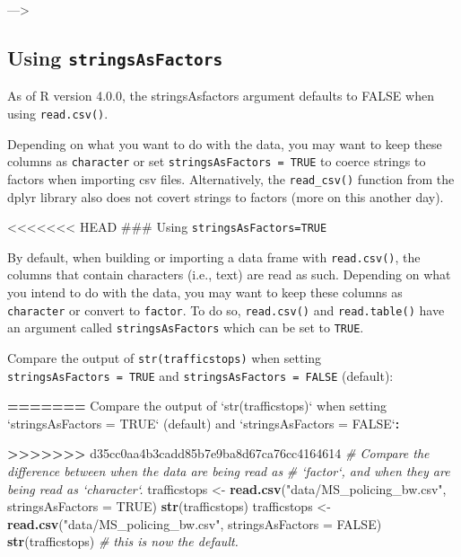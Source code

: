\documentclass[
]{book}
\newenvironment{Shaded}{\begin{snugshade}}{\end{snugshade}}
\newcommand{\CommentTok}[1]{\textcolor[rgb]{0.56,0.35,0.01}{\textit{#1}}}
\newcommand{\DataTypeTok}[1]{\textcolor[rgb]{0.13,0.29,0.53}{#1}}
\newcommand{\ErrorTok}[1]{\textcolor[rgb]{0.64,0.00,0.00}{\textbf{#1}}}
\newcommand{\KeywordTok}[1]{\textcolor[rgb]{0.13,0.29,0.53}{\textbf{#1}}}
\newcommand{\NormalTok}[1]{#1}
\newcommand{\OperatorTok}[1]{\textcolor[rgb]{0.81,0.36,0.00}{\textbf{#1}}}
\newcommand{\OtherTok}[1]{\textcolor[rgb]{0.56,0.35,0.01}{#1}}
\newcommand{\StringTok}[1]{\textcolor[rgb]{0.31,0.60,0.02}{#1}}
\begin{document}
---\textgreater{}

\hypertarget{using-stringsasfactors}{%
\subsection{\texorpdfstring{Using \texttt{stringsAsFactors}}{Using stringsAsFactors}}\label{using-stringsasfactors}}

As of R version 4.0.0, the stringsAsfactors argument defaults to FALSE when using \texttt{read.csv()}.

Depending on what you want to do with the data, you may want to keep these columns as \texttt{character} or set \texttt{stringsAsFactors\ =\ TRUE} to coerce strings to factors when importing csv files. Alternatively, the \texttt{read\_csv()} function from the dplyr library also does not covert strings to factors (more on this another day).

\textless\textless\textless\textless\textless\textless\textless{} HEAD
\#\#\# Using \texttt{stringsAsFactors=TRUE}

By default, when building or importing a data frame with \texttt{read.csv()}, the columns that contain characters (i.e., text) are read as such. Depending on what you intend to do with the data, you may want to keep these
columns as \texttt{character} or convert to \texttt{factor}. To do so, \texttt{read.csv()} and \texttt{read.table()} have an
argument called \texttt{stringsAsFactors} which can be set to \texttt{TRUE}.

Compare the output of \texttt{str(trafficstops)} when setting \texttt{stringsAsFactors\ =\ TRUE}
and \texttt{stringsAsFactors\ =\ FALSE} (default):

\begin{Shaded}
\begin{Highlighting}[]
\OperatorTok{==}\ErrorTok{=====}
\NormalTok{Compare the output of }\StringTok{`}\DataTypeTok{str(trafficstops)}\StringTok{`}\NormalTok{ when setting }\StringTok{`}\DataTypeTok{stringsAsFactors = TRUE}\StringTok{`}
\NormalTok{(default) and }\StringTok{`}\DataTypeTok{stringsAsFactors = FALSE}\StringTok{`}\OperatorTok{:}
\end{Highlighting}
\end{Shaded}

\begin{Shaded}
\begin{Highlighting}[]
\OperatorTok{>}\ErrorTok{>>>>>>}\StringTok{ }\NormalTok{d35cc0aa4b3cadd85b7e9ba8d67ca76cc4164614}
\CommentTok{# Compare the difference between when the data are being read as}
\CommentTok{# `factor`, and when they are being read as `character`.}
\NormalTok{trafficstops <-}\StringTok{ }\KeywordTok{read.csv}\NormalTok{(}\StringTok{"data/MS_policing_bw.csv"}\NormalTok{, }\DataTypeTok{stringsAsFactors =} \OtherTok{TRUE}\NormalTok{)}
\KeywordTok{str}\NormalTok{(trafficstops)}
\NormalTok{trafficstops <-}\StringTok{ }\KeywordTok{read.csv}\NormalTok{(}\StringTok{"data/MS_policing_bw.csv"}\NormalTok{, }\DataTypeTok{stringsAsFactors =} \OtherTok{FALSE}\NormalTok{)}
\KeywordTok{str}\NormalTok{(trafficstops) }\CommentTok{# this is now the default.}
\end{Highlighting}
\end{Shaded}
\end{document}
